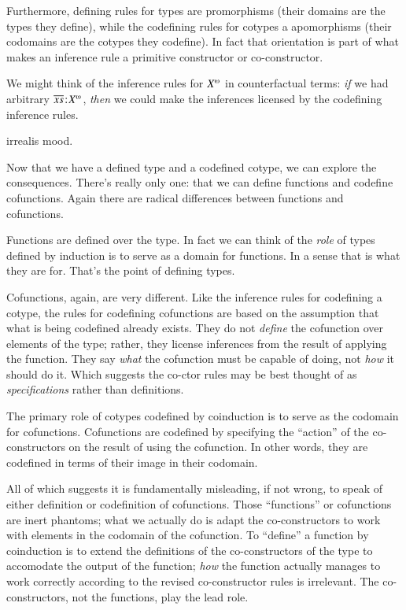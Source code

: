 \documentclass{article}
\begin{document}
Furthermore, defining rules for types are promorphisms (their domains
are the types they define), while the codefining rules for cotypes a
apomorphisms (their codomains are the cotypes they codefine). In fact
that orientation is part of what makes an inference rule a primitive
constructor or co-constructor.

We might think of the inference rules for \(\colist{X}\) in
counterfactual terms: \textit{if} we had arbitrary
\(\tj{\coseq{x}}{\colist{X}}\), \textit{then} we could make the
inferences licensed by the codefining inference rules.

irrealis mood.

Now that we have a defined type and a codefined cotype, we can explore
the consequences. There's really only one: that we can define
functions and codefine cofunctions. Again there are radical differences between functions and cofunctions.

Functions are defined over the type. In fact we can think of the
\textit{role} of types defined by induction is to serve as a domain
for functions. In a sense that is what they are for. That's the point
of defining types.

Cofunctions, again, are very different. Like the inference rules for
codefining a cotype, the rules for codefining cofunctions are based on
the assumption that what is being codefined already exists. They do
not \textit{define} the cofunction over elements of the type; rather,
they license inferences from the result of applying the function. They
say \textit{what} the cofunction must be capable of doing, not
\textit{how} it should do it. Which suggests the co-ctor rules may be
best thought of as \textit{specifications} rather than definitions.

The primary role of cotypes codefined by coinduction is to serve as
the codomain for cofunctions. Cofunctions are codefined by specifying
the ``action'' of the co-constructors on the result of using the
cofunction. In other words, they are codefined in terms of their image
in their codomain.

All of which suggests it is fundamentally misleading, if not wrong, to
speak of either definition or codefinition of cofunctions. Those
``functions'' or cofunctions are inert phantoms; what we actually do
is adapt the co-constructors to work with elements in the codomain of
the cofunction. To ``define'' a function by coinduction is to extend
the definitions of the co-constructors of the type to accomodate the
output of the function; \textit{how} the function actually manages to
work correctly according to the revised co-constructor rules is
irrelevant. The co-constructors, not the functions, play the lead
role.
\end{document}
